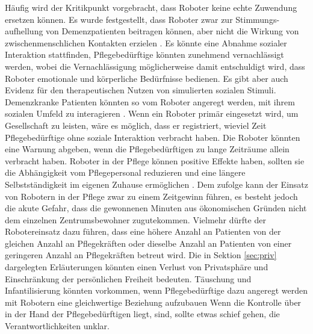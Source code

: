 Häufig  wird  der  Kritikpunkt  vorgebracht,  dass  Roboter  keine  echte  Zuwendung  ersetzen  können.  Es wurde festgestellt,  dass  Roboter  zwar  zur  Stimmungs-aufhellung   von   Demenzpatienten   beitragen   können,   aber   nicht   die   Wirkung   von   zwischenmenschlichen  Kontakten  erzielen \cite[79]{vier}. Es könnte eine Abnahme sozialer Interaktion stattfinden, Pflegebedürftige könnten zunehmend vernachlässigt werden, wobei die Vernachlässigung möglicherweise damit entschuldigt wird, dass Roboter emotionale und körperliche Bedürfnisse bedienen. Es gibt aber auch Evidenz  für  den  therapeutischen  Nutzen  von  simulierten  sozialen  Stimuli. Demenzkranke Patienten könnten so vom Roboter angeregt werden, mit ihrem sozialen Umfeld zu interagieren \cite[79]{vier}. Wenn ein Roboter primär eingesetzt wird, um Gesellschaft zu leisten, wäre es möglich, dass er registriert, wieviel Zeit Pflegebedürftige ohne soziale Interaktion verbracht haben. Die Roboter könnten eine Warnung abgeben, wenn die Pflegebedürftigen zu lange Zeiträume allein verbracht haben. Roboter in der Pflege können  positive Effekte haben, sollten sie die Abhängigkeit vom Pflegepersonal reduzieren und eine längere Selbstständigkeit im eigenen Zuhause ermöglichen \cite[31]{sharky}. Dem zufolge kann der Einsatz von Robotern in der Pflege zwar zu einem Zeitgewinn führen, es  besteht  jedoch  die  akute  Gefahr,  dass  die  gewonnenen  Minuten  aus  ökonomischen  Gründen nicht  dem  einzelnen  Zentrumsbewohner  zugutekommen.  Vielmehr  dürfte  der  Robotereinsatz  dazu  führen,  dass  eine  höhere  Anzahl  an  Patienten  von  der  gleichen  Anzahl an Pflegekräften oder dieselbe Anzahl an Patienten von einer geringeren Anzahl an  Pflegekräften  betreut  wird\cite[143]{sparrow}. Die in Sektion \ref{sec:priv} dargelegten Erläuterungen könnten einen Verlust von Privatsphäre und Einschränkung der persönlichen Freiheit bedeuten.
Täuschung und Infantilisierung könnten vorkommen, wenn Pflegebedürftige dazu angeregt werden mit Robotern eine gleichwertige Beziehung aufzubauen Wenn die Kontrolle über in der Hand der Pflegebedürftigen liegt, sind, sollte etwas schief gehen, die Verantwortlichkeiten unklar.







